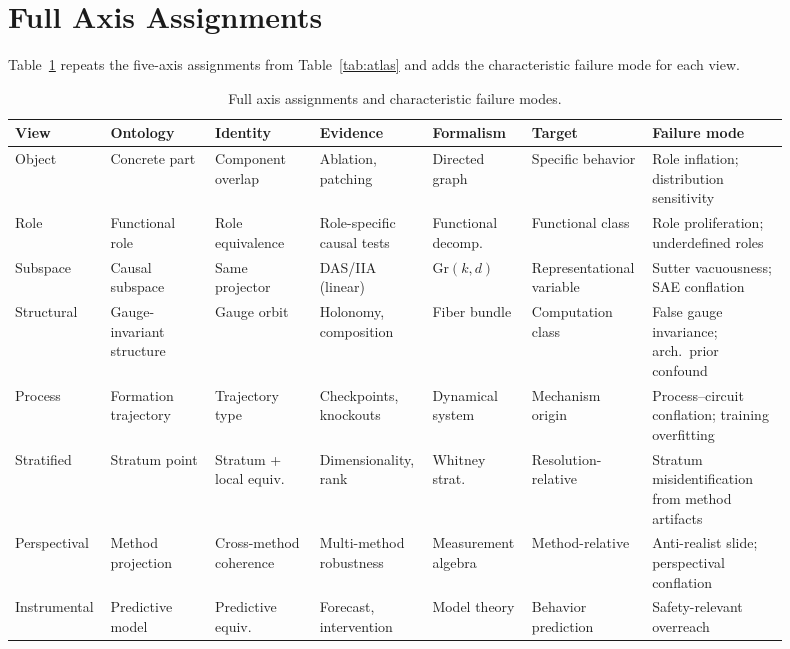 \documentclass[11pt]{article}
\theoremstyle{remark}
\newcommand{\Gr}{\mathrm{Gr}}
\begin{document}
\section{Full Axis Assignments}\label{app:axes}

Table~\ref{tab:full} repeats the five-axis assignments from
Table~\ref{tab:atlas} and adds the characteristic failure mode for each
view.

\begin{table}[ht]
\centering
\footnotesize
\setlength{\tabcolsep}{3pt}
\begin{tabular}{p{0.09\linewidth}p{0.13\linewidth}p{0.13\linewidth}p{0.14\linewidth}p{0.12\linewidth}p{0.12\linewidth}p{0.17\linewidth}}
\toprule
\textbf{View} & \textbf{Ontology}
  & \textbf{Identity} & \textbf{Evidence}
  & \textbf{Formalism} & \textbf{Target}
  & \textbf{Failure mode} \\
\midrule
Object
  & Concrete part
  & Component overlap
  & Ablation, patching
  & Directed graph
  & Specific behavior
  & Role inflation; distribution sensitivity \\[2pt]
Role
  & Functional role
  & Role equivalence
  & Role-specific causal tests
  & Functional decomp.
  & Functional class
  & Role proliferation; underdefined roles \\[2pt]
Subspace
  & Causal subspace
  & Same projector
  & DAS/IIA (linear)
  & $\Gr(k,d)$
  & Representational variable
  & Sutter vacuousness; SAE conflation \\[2pt]
Structural
  & Gauge-invariant structure
  & Gauge orbit
  & Holonomy, composition
  & Fiber bundle
  & Computation class
  & False gauge invariance; arch.\ prior confound \\[2pt]
Process
  & Formation trajectory
  & Trajectory type
  & Checkpoints, knockouts
  & Dynamical system
  & Mechanism origin
  & Process--circuit conflation; training overfitting \\[2pt]
Stratified
  & Stratum point
  & Stratum + local equiv.
  & Dimensionality, rank
  & Whitney strat.
  & Resolution-relative
  & Stratum misidentification from method artifacts \\[2pt]
Perspectival
  & Method projection
  & Cross-method coherence
  & Multi-method robustness
  & Measurement algebra
  & Method-relative
  & Anti-realist slide; perspectival conflation \\[2pt]
Instrumental
  & Predictive model
  & Predictive equiv.
  & Forecast, intervention
  & Model theory
  & Behavior prediction
  & Safety-relevant overreach \\
\bottomrule
\end{tabular}
\caption{Full axis assignments and characteristic failure modes.}
\label{tab:full}
\end{table}
\end{document}
